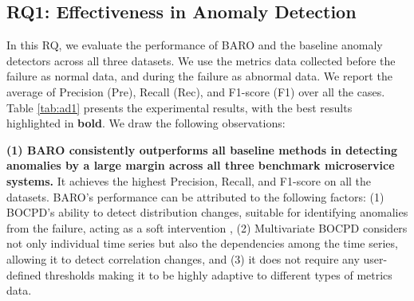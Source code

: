 \subsection{RQ1: Effectiveness in Anomaly Detection}


In this RQ, we evaluate the performance of BARO and the baseline anomaly detectors across all three datasets. We use the metrics data collected before the failure as normal data, and during the failure as abnormal data. We report the average of Precision (Pre), Recall (Rec), and F1-score (F1) over all the cases. Table \ref{tab:ad1} presents the experimental results, with the best results highlighted in \textbf{bold}. We draw the following observations:

\textbf{(1) BARO consistently outperforms all baseline methods in detecting anomalies by a large margin across all three benchmark microservice systems.} It achieves the highest Precision, Recall, and F1-score on all the datasets. BARO's performance can be attributed to the following factors: (1) BOCPD's ability to detect distribution changes, suitable for identifying anomalies from the failure, acting as a soft intervention \cite{Azam2022rcd, Li2022Circa}, (2) Multivariate BOCPD considers not only individual time series but also the dependencies among the time series, allowing it to detect correlation changes, and (3) it does not require any user-defined thresholds making it to be highly adaptive to different types of metrics data.


